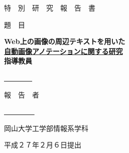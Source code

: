\begin{center}
 \vspace{80pt}
 
 \large{特　別　研　究　報　告　書}

 \vspace{60pt}
 \large{題　目}
 \vspace{60pt}
 
 \bf\LARGE\hspace{5pt}Web上の画像の周辺テキストを用いた\hspace{5pt}\\
 \underline{\bf \LARGE\hspace{5pt} 自動画像アノテーションに関する研究 \hspace{5pt}} \\
 \vspace{7pt}
 \vspace{100pt}
 \large{指導教員}
 \vspace{15pt}

 \underline{\LARGE\hspace{5pt} 　　\hspace{10pt}　　 \hspace{5pt}}

 \vspace{50pt}
 \large{報　告　者}
 \vspace{10pt}

 \underline{\LARGE \hspace{5pt} 　　 \hspace{10pt} 　　 \hspace{5pt}}

 \vspace{110pt}
 岡山大学工学部情報系学科

 \vspace{20pt}
 平成２７年２月６日提出
\end{center}